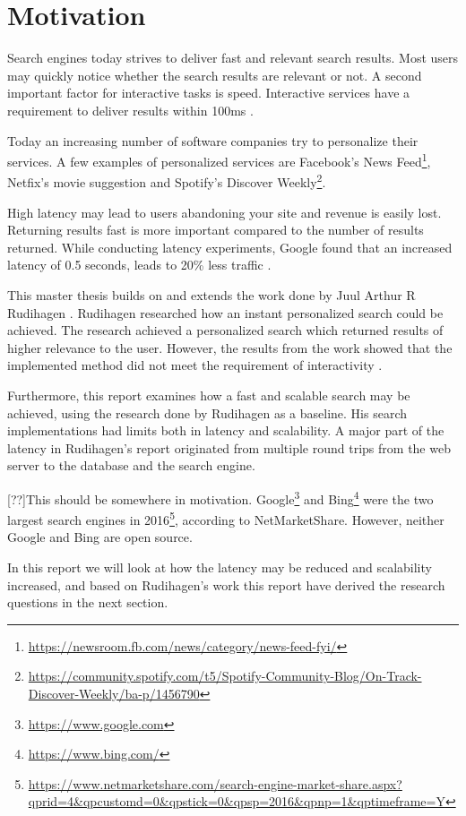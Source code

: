 \section{Motivation}
Search engines today strives to deliver fast and relevant search results.
Most users may quickly notice whether the search results are relevant or not.
A second important factor for interactive tasks is speed.
Interactive services have a requirement to deliver results within 100ms \cite{google-latency}.

Today an increasing number of software companies try to personalize their services.
A few examples of personalized services are Facebook's News Feed\footnote{\url{https://newsroom.fb.com/news/category/news-feed-fyi/}},
Netfix's movie suggestion \cite{netflix-recommendation} and Spotify's Discover Weekly\footnote{\url{https://community.spotify.com/t5/Spotify-Community-Blog/On-Track-Discover-Weekly/ba-p/1456790}}.

High latency may lead to users abandoning your site and revenue is easily lost.
Returning results fast is more important compared to the number of results returned.
While conducting latency experiments, Google found that an increased latency of 0.5 seconds, leads to 20\% less traffic \cite{google-marissa}.

This master thesis builds on and extends the work done by Juul Arthur R Rudihagen \cite{master-thesis}.
Rudihagen researched how an instant personalized search could be achieved.
The research achieved a personalized search which returned results of higher relevance to the user.
However, the results from the work showed that the implemented method did not meet the requirement of interactivity \cite{master-thesis}.

Furthermore, this report examines how a fast and scalable search may be achieved, using the research done by Rudihagen as a baseline.
His search implementations had limits both in latency and scalability.
A major part of the latency in Rudihagen's report originated from multiple round trips from the web server to the database and the search engine.

[??]This should be somewhere in motivation.
Google\footnote{\url{https://www.google.com}} and Bing\footnote{\url{https://www.bing.com/}}
were the two largest search engines in 2016\footnote{\url{https://www.netmarketshare.com/search-engine-market-share.aspx?qprid=4&qpcustomd=0&qpstick=0&qpsp=2016&qpnp=1&qptimeframe=Y}},
according to NetMarketShare.
However, neither Google and Bing are open source.

In this report we will look at how the latency may be reduced and scalability increased,
and based on Rudihagen's work this report have derived the research questions in the next section.
